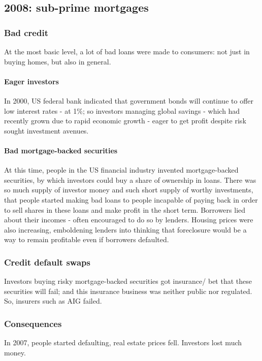 \documentclass[oneside, article]{memoir}
\begin{document}
\subsection{2008: sub-prime mortgages}
\subsubsection{Bad credit}
At the most basic level, a lot of bad loans were made to consumers: not just in buying homes, but also in general.

\paragraph{Eager investors}
In 2000, US federal bank indicated that government bonds will continue to offer low interest rates - at 1\%; so investors managing global savings - which had recently grown due to rapid economic growth - eager to get profit despite risk sought investment avenues.

\paragraph{Bad mortgage-backed securities}
At this time, people in the US financial industry invented mortgage-backed securities, by which investors could buy a share of ownership in loans. There was so much supply of investor money and such short supply of worthy investments, that people started making bad loans to people incapable of paying back in order to sell shares in these loans and make profit in the short term. Borrowers lied about their incomes - often encouraged to do so by lenders. Housing prices were also increasing, emboldening lenders into thinking that foreclosure would be a way to remain profitable even if borrowers defaulted.

\subsubsection{Credit default swaps}
Investors buying risky mortgage-backed securities got insurance/ bet that these securities will fail; and this insurance business was neither public nor regulated. So, insurers such as AIG failed.

\subsubsection{Consequences}
In 2007, people started defaulting, real estate prices fell. Investors lost much money.
\end{document}
